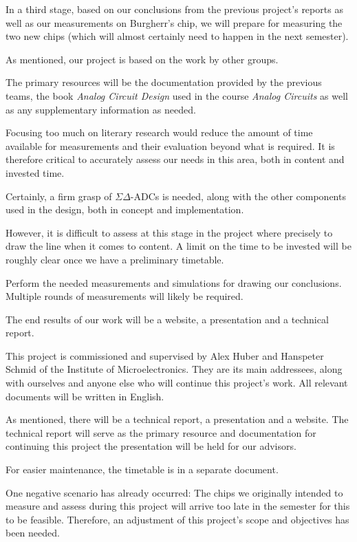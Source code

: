 \documentclass[a4paper,10pt]{article}
\begin{document}
\begin{description}[align=left]
        In a third stage, based on our conclusions from the previous project's
        reports  as well  as  our  measurements on  Burgherr's  chip, we  will
        prepare for measuring  the two new chips (which  will almost certainly
        need to happen in the next semester).
    \item[Preceding Work:]
        As mentioned, our project is based on the work by other groups.
    \item[Sources:]
        The  primary  resources will  be  the  documentation provided  by  the
        previous  teams, the  book \emph{Analog  Circuit Design}  used in  the
        course \emph{Analog Circuits} as well as any supplementary information
        as needed.
    \item[Scope of Literary Research:]
        Focusing too much on literary research would reduce the amount of time
        available  for  measurements  and  their  evaluation  beyond  what  is
        required. It is therefore  critical to accurately assess  our needs in
        this area, both in content and invested time.

        Certainly, a firm  grasp of $\Sigma\Delta$-ADCs is  needed, along with
        the  other  components  used  in  the  design,  both  in  concept  and
        implementation.

        However, it is difficult to assess  at this stage in the project where
        precisely to  draw the line when  it comes to content. A  limit on the
        time to be  invested will be roughly clear once  we have a preliminary
        timetable.
    \item[Scope of Experiments:]
        Perform  the  needed  measurements  and simulations  for  drawing  our
        conclusions. Multiple rounds of measurements will likely be required.
    \item[Genre and Addressees:]
        The end results  of our work will  be a website, a  presentation and a
        technical report.

        This  project  is  commissioned  and  supervised  by  Alex  Huber  and
        Hanspeter Schmid  of the  Institute of Microelectronics. They  are its
        main  addressees,  along  with  ourselves and  anyone  else  who  will
        continue this project's work.  All  relevant documents will be written
        in English.
    \item[Preliminary Structuring:]
        As mentioned, there  will be a technical report, a  presentation and a
        website. The technical report  will serve as the  primary resource and
        documentation  for continuing  this project  the presentation  will be
        held for our advisors.
    \item[Timetable:]
        For easier maintenance, the timetable is in a separate document.
    \item[Risk Assessment:]
        One negative  scenario has  already occurred: The chips  we originally
        intended to  measure and  assess during this  project will  arrive too
        late in the semester for this to be feasible. Therefore, an adjustment
        of this project's scope and objectives has been needed.


\end{description}
\end{document}
